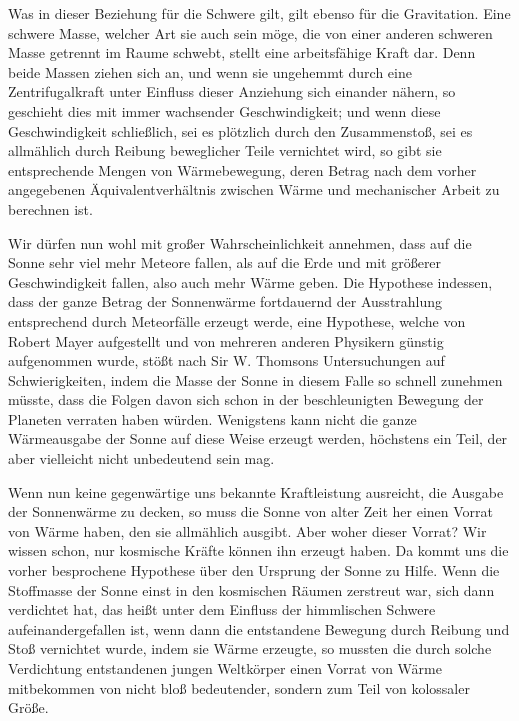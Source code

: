\documentclass[a4paper, 11pt, oneside, german]{article}
\begin{document}
Was in dieser Beziehung für die Schwere gilt, gilt ebenso für die Gravitation. Eine schwere Masse, welcher Art sie auch sein möge, die von einer anderen schweren Masse getrennt im Raume schwebt, stellt eine arbeitsfähige Kraft dar. Denn beide Massen ziehen sich an, und wenn sie ungehemmt durch eine Zentrifugalkraft unter Einfluss dieser Anziehung sich einander nähern, so geschieht dies mit immer wachsender Geschwindigkeit; und wenn diese Geschwindigkeit schließlich, sei es plötzlich durch den Zusammenstoß, sei es allmählich durch Reibung beweglicher Teile vernichtet wird, so gibt sie entsprechende Mengen von Wärmebewegung, deren Betrag nach dem vorher angegebenen Äquivalentverhältnis zwischen Wärme und mechanischer Arbeit zu berechnen ist.

Wir dürfen nun wohl mit großer Wahrscheinlichkeit annehmen, dass auf die Sonne sehr viel mehr Meteore fallen, als auf die Erde und mit größerer Geschwindigkeit fallen, also auch mehr Wärme geben. Die Hypothese indessen, dass der ganze Betrag der Sonnenwärme fortdauernd der Ausstrahlung entsprechend durch Meteorfälle erzeugt werde, eine Hypothese, welche von Robert Mayer aufgestellt und von mehreren anderen Physikern günstig aufgenommen wurde, stößt nach Sir W. Thomsons Untersuchungen auf Schwierigkeiten, indem die Masse der Sonne in diesem Falle so schnell zunehmen müsste, dass die Folgen davon sich schon in der beschleunigten Bewegung der Planeten verraten haben würden. Wenigstens kann nicht die ganze Wärmeausgabe der Sonne auf diese Weise erzeugt werden, höchstens ein Teil, der aber vielleicht nicht unbedeutend sein mag.

Wenn nun keine gegenwärtige uns bekannte Kraftleistung ausreicht, die Ausgabe der Sonnenwärme zu decken, so muss die Sonne von alter Zeit her einen Vorrat von Wärme haben, den sie allmählich ausgibt. Aber woher dieser Vorrat? Wir wissen schon, nur kosmische Kräfte können ihn erzeugt haben. Da kommt uns die vorher besprochene Hypothese über den Ursprung der Sonne zu Hilfe. Wenn die Stoffmasse der Sonne einst in den kosmischen Räumen zerstreut war, sich dann verdichtet hat, das heißt unter dem Einfluss der himmlischen Schwere aufeinandergefallen ist, wenn dann die entstandene Bewegung durch Reibung und Stoß vernichtet wurde, indem sie Wärme erzeugte, so mussten die durch solche Verdichtung entstandenen jungen Weltkörper einen Vorrat von Wärme mitbekommen von nicht bloß bedeutender, sondern zum Teil von kolossaler Größe.
\end{document}
